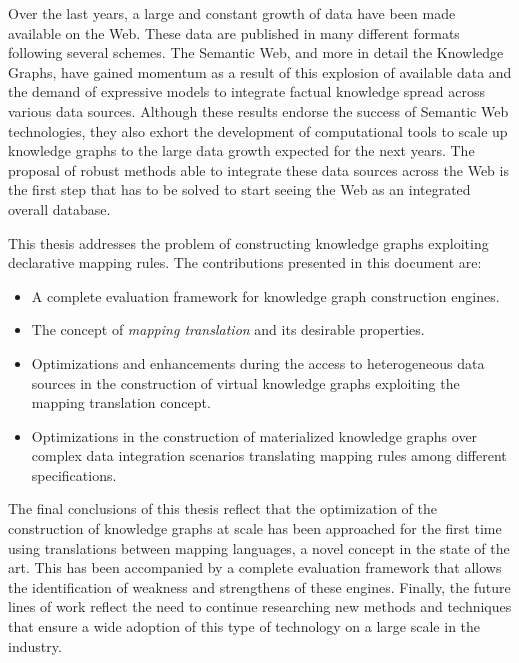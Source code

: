 


\begin{abstractslong}    
Over the last years, a large and constant growth of data have been made available on the Web. These data are published in many different formats following several schemes. The Semantic Web, and more in detail the Knowledge Graphs, have gained momentum as a result of this explosion of available data and the demand of expressive models to integrate factual knowledge spread across various data sources. Although these results endorse the success of Semantic Web technologies, they also exhort the development of computational tools to scale up knowledge graphs to the large data growth expected for the next years. The proposal of robust methods able to integrate these data sources across the Web is the first step that has to be solved to start seeing the Web as an integrated overall database.

This thesis addresses the problem of constructing knowledge graphs exploiting declarative mapping rules. The contributions presented in this document are:
\begin{itemize}
     \item A complete evaluation framework for knowledge graph construction engines.
     \item The concept of \textit{mapping translation} and its desirable properties.
     \item Optimizations and enhancements during the access to heterogeneous data sources in the construction of virtual knowledge graphs exploiting the mapping translation concept.
     \item Optimizations in the construction of materialized knowledge graphs over complex data integration scenarios translating mapping rules among different specifications.
\end{itemize}

The final conclusions of this thesis reflect that the optimization of the construction of knowledge graphs at scale has been approached for the first time using translations between mapping languages, a novel concept in the state of the art. This has been accompanied by a complete evaluation framework that allows the identification of weakness and strengthens of these engines. Finally, the future lines of work reflect the need to continue researching new methods and techniques that ensure a wide adoption of this type of technology on a large scale in the industry.
\end{abstractslong}

